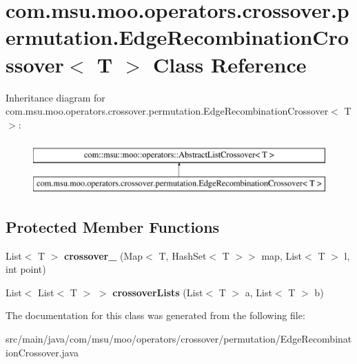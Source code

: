 \hypertarget{classcom_1_1msu_1_1moo_1_1operators_1_1crossover_1_1permutation_1_1EdgeRecombinationCrossover_3_01T_01_4}{\section{com.\-msu.\-moo.\-operators.\-crossover.\-permutation.\-Edge\-Recombination\-Crossover$<$ T $>$ Class Reference}
\label{classcom_1_1msu_1_1moo_1_1operators_1_1crossover_1_1permutation_1_1EdgeRecombinationCrossover_3_01T_01_4}
}
Inheritance diagram for com.\-msu.\-moo.\-operators.\-crossover.\-permutation.\-Edge\-Recombination\-Crossover$<$ T $>$\-:\begin{figure}[H]
\begin{center}
\leavevmode
\includegraphics[height=2.000000cm]{classcom_1_1msu_1_1moo_1_1operators_1_1crossover_1_1permutation_1_1EdgeRecombinationCrossover_3_01T_01_4}
\end{center}
\end{figure}
\subsection*{Protected Member Functions}
\begin{DoxyCompactItemize}
\item 
\hypertarget{classcom_1_1msu_1_1moo_1_1operators_1_1crossover_1_1permutation_1_1EdgeRecombinationCrossover_3_01T_01_4_a99458e63b59009a585d6b4cf1799d80e}{List$<$ T $>$ {\bfseries crossover\-\_\-} (Map$<$ T, Hash\-Set$<$ T $>$$>$ map, List$<$ T $>$ l, int point)}\label{classcom_1_1msu_1_1moo_1_1operators_1_1crossover_1_1permutation_1_1EdgeRecombinationCrossover_3_01T_01_4_a99458e63b59009a585d6b4cf1799d80e}

\item 
\hypertarget{classcom_1_1msu_1_1moo_1_1operators_1_1crossover_1_1permutation_1_1EdgeRecombinationCrossover_3_01T_01_4_abd4e62911d49e28b2844cfbf01d673b9}{List$<$ List$<$ T $>$ $>$ {\bfseries crossover\-Lists} (List$<$ T $>$ a, List$<$ T $>$ b)}\label{classcom_1_1msu_1_1moo_1_1operators_1_1crossover_1_1permutation_1_1EdgeRecombinationCrossover_3_01T_01_4_abd4e62911d49e28b2844cfbf01d673b9}

\end{DoxyCompactItemize}


The documentation for this class was generated from the following file\-:\begin{DoxyCompactItemize}
\item 
src/main/java/com/msu/moo/operators/crossover/permutation/Edge\-Recombination\-Crossover.\-java\end{DoxyCompactItemize}
